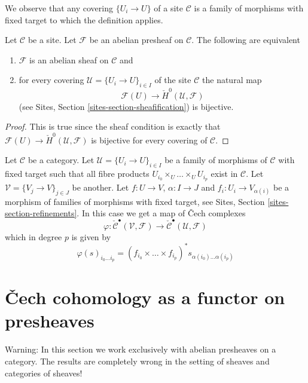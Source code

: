 \noindent
We observe that any covering $\{U_i \to U\}$ of a site $\mathcal{C}$
is a family of morphisms with fixed target to which the definition applies.

\begin{lemma}
\label{lemma-cech-h0}
Let $\mathcal{C}$ be a site.
Let $\mathcal{F}$ be an abelian presheaf on $\mathcal{C}$.
The following are equivalent
\begin{enumerate}
\item $\mathcal{F}$ is an abelian sheaf on $\mathcal{C}$ and
\item for every covering $\mathcal{U} = \{U_i \to U\}_{i \in I}$
of the site $\mathcal{C}$ the natural map
$$
\mathcal{F}(U) \to \check{H}^0(\mathcal{U}, \mathcal{F})
$$
(see Sites, Section \ref{sites-section-sheafification}) is bijective.
\end{enumerate}
\end{lemma}

\begin{proof}
This is true since the sheaf condition is exactly that
$\mathcal{F}(U) \to \check{H}^0(\mathcal{U}, \mathcal{F})$
is bijective for every covering of $\mathcal{C}$.
\end{proof}

\noindent
Let $\mathcal{C}$ be a category. Let $\mathcal{U} = \{U_i \to U\}_{i\in I}$
be a family of morphisms of $\mathcal{C}$ with fixed target such that
all fibre products $U_{i_0} \times_U \ldots \times_U U_{i_p}$ exist in
$\mathcal{C}$. Let $\mathcal{V} = \{V_j \to V\}_{j\in J}$ be another.
Let $f : U \to V$, $\alpha : I \to J$ and $f_i : U_i \to V_{\alpha(i)}$
be a morphism of families of morphisms with fixed target, see
Sites, Section \ref{sites-section-refinements}.
In this case we get a map of {\v C}ech complexes
\begin{equation}
\label{equation-map-cech-complexes}
\varphi : \check{\mathcal{C}}^\bullet(\mathcal{V}, \mathcal{F})
\longrightarrow
\check{\mathcal{C}}^\bullet(\mathcal{U}, \mathcal{F})
\end{equation}
which in degree $p$ is given by
$$
\varphi(s)_{i_0 \ldots i_p} =
(f_{i_0} \times \ldots \times f_{i_p})^*s_{\alpha(i_0) \ldots \alpha(i_p)}
$$


\section{{\v C}ech cohomology as a functor on presheaves}
\label{section-cech-functor}

\noindent
Warning: In this section we work exclusively with abelian presheaves
on a category. The results are completely wrong in the
setting of sheaves and categories of sheaves!

